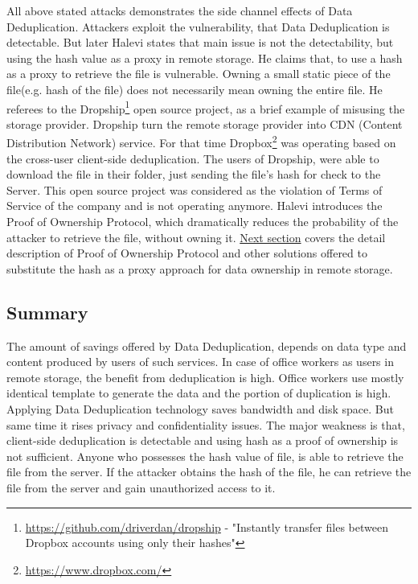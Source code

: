 \documentclass[12pt]{article}
\begin{document}
All above stated attacks demonstrates the side channel effects of Data Deduplication. Attackers exploit the vulnerability, that Data Deduplication is detectable. But later Halevi states that main issue is not the detectability, but using the hash value as a proxy in remote storage.\cite{PoW} He claims that, to use a hash as a proxy to retrieve the file is vulnerable. Owning a small static piece of the file(e.g. hash of the file) does not necessarily mean owning the entire file. He referees to the Dropship\footnote{\url{https://github.com/driverdan/dropship} - "Instantly transfer files between Dropbox accounts using only their hashes"} open source project, as a brief example of misusing the storage provider. Dropship turn the remote storage  provider into CDN (Content Distribution Network) service. For that time Dropbox\footnote{\url{https://www.dropbox.com/}} was operating based on the cross-user client-side deduplication. The users of Dropship, were able to download the file in their folder, just sending the file’s hash for check to the Server. This open source project was considered as the violation of Terms of Service of the company and is not operating anymore. Halevi introduces the Proof of Ownership Protocol, which dramatically reduces the probability of the attacker to retrieve the file, without owning it. \hyperref[sec:4]{Next section} covers the detail description of Proof of Ownership Protocol and other solutions offered to substitute the hash as a proxy approach for data ownership in remote storage.\cite{PoW}

\subsection{Summary}
\label{subsub:AttackSummary}
The amount of savings offered by Data Deduplication, depends on data type and content produced by users of such services.\cite{ratio}  In case of office workers as users in remote storage, the benefit from deduplication is high. Office workers use mostly identical template to generate the data and the portion of duplication is high. Applying Data Deduplication technology saves bandwidth and disk space.  But same time it rises privacy and confidentiality issues. The major weakness is that, client-side deduplication is detectable and using hash as a proof of ownership is not sufficient. Anyone who possesses the hash value of file, is able to retrieve the file from the server.  If the attacker  obtains the hash of the file, he can retrieve the file from the server and gain unauthorized access to it.
\pagebreak
\end{document}
